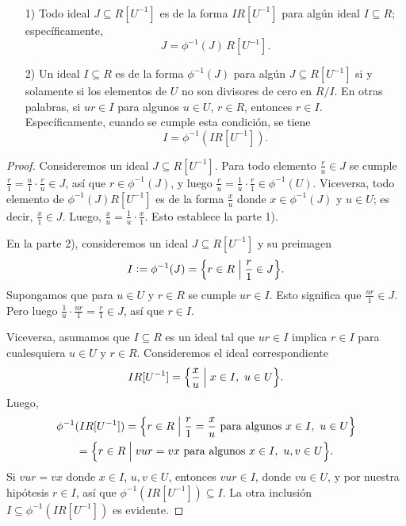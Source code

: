 \begin{proposicion}
  \label{prop:ideales-en-la-localizacion}
  ~

  \begin{enumerate}
  \item[1)] Todo ideal $J \subseteq R [U^{-1}]$ es de la forma $I R [U^{-1}]$
    para algún ideal $I \subseteq R$; específicamente,
    $$J = \phi^{-1} (J)\,R [U^{-1}].$$

  \item[2)] Un ideal $I \subseteq R$ es de la forma $\phi^{-1} (J)$ para algún
    $J \subseteq R [U^{-1}]$ si y solamente si los elementos de $U$ no son
    divisores de cero en $R/I$. En otras palabras, si $ur \in I$ para algunos
    $u\in U$, $r\in R$, entonces $r\in I$. Específicamente, cuando se cumple
    esta condición, se tiene
    $$I = \phi^{-1} (I R [U^{-1}]).$$
  \end{enumerate}

  \begin{proof}
    Consideremos un ideal $J \subseteq R [U^{-1}]$. Para todo elemento
    $\frac{r}{u} \in J$ se cumple
    $\frac{r}{1} = \frac{u}{1}\cdot\frac{r}{u} \in J$, así que
    $r \in \phi^{-1} (J)$, y luego
    $\frac{r}{u} = \frac{1}{u}\cdot \frac{r}{1} \in \phi^{-1} (U)$. Viceversa,
    todo elemento de $\phi^{-1} (J) R [U^{-1}]$ es de la forma $\frac{x}{u}$
    donde $x \in \phi^{-1} (J)$ y $u \in U$; es decir,
    $\frac{x}{1} \in J$. Luego,
    $\frac{x}{u} = \frac{1}{u}\cdot \frac{x}{1}$. Esto establece la parte 1).

    \vspace{1em}

    En la parte 2), consideremos un ideal $J \subseteq R [U^{-1}]$ y su
    preimagen
    $$I \mathrel{\mathop:}= \phi^{-1} (J) = \Bigl\{ r\in R \Bigm| \frac{r}{1} \in J \Bigr\}.$$
    Supongamos que para $u \in U$ y $r\in R$ se cumple $ur \in I$. Esto
    significa que $\frac{ur}{1} \in J$. Pero luego
    $\frac{1}{u}\cdot \frac{ur}{1} = \frac{r}{1} \in J$, así que $r\in I$.

    Viceversa, asumamos que $I \subseteq R$ es un ideal tal que $ur \in I$
    implica $r\in I$ para cualesquiera $u\in U$ y $r\in R$. Consideremos
    el ideal correspondiente
    $$I R [U^{-1}] = \Bigl\{ \frac{x}{u} \Bigm| x\in I, ~ u\in U \Bigr\}.$$
    Luego,
    \begin{multline*}
      \phi^{-1} (I R [U^{-1}]) =
      \Bigl\{ r\in R \Bigm| \frac{r}{1} = \frac{x}{u} \text{ para algunos }x\in I, ~ u\in U \Bigr\} \\
      = \Bigl\{ r\in R \Bigm| vur = vx \text{ para algunos }x\in I, ~ u,v\in U \Bigr\}.
    \end{multline*}
    Si $vur = vx$ donde $x\in I$, $u,v\in U$, entonces $vur \in I$, donde
    $vu \in U$, y por nuestra hipótesis $r\in I$, así que
    $\phi^{-1} (I R [U^{-1}]) \subseteq I$. La otra inclusión
    $I \subseteq \phi^{-1} (I R [U^{-1}])$ es evidente.
  \end{proof}
\end{proposicion}

